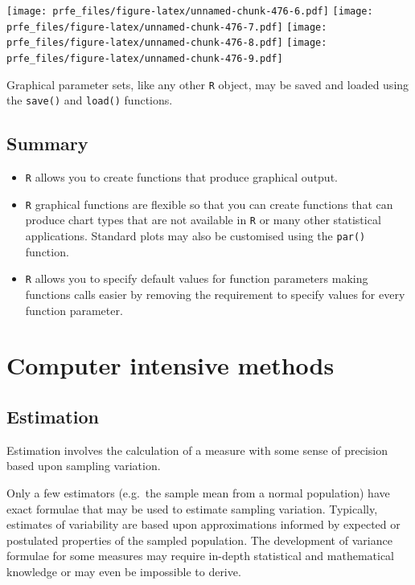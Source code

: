 \documentclass[12pt,a4paper]{book}
\theoremstyle{definition}
\theoremstyle{definition}
\theoremstyle{definition}
\theoremstyle{remark}
\begin{document}
\texttt{[image: prfe\_files/figure-latex/unnamed-chunk-476-6.pdf]}
\texttt{[image: prfe\_files/figure-latex/unnamed-chunk-476-7.pdf]}
\texttt{[image: prfe\_files/figure-latex/unnamed-chunk-476-8.pdf]}
\texttt{[image: prfe\_files/figure-latex/unnamed-chunk-476-9.pdf]}

Graphical parameter sets, like any other \texttt{R} object, may be saved
and loaded using the \texttt{save()} and \texttt{load()} functions.

\hypertarget{summary-7}{%
\section{Summary}\label{summary-7}}

\begin{itemize}
\item
  \texttt{R} allows you to create functions that produce graphical
  output.
\item
  \texttt{R} graphical functions are flexible so that you can create
  functions that can produce chart types that are not available in
  \texttt{R} or many other statistical applications. Standard plots may
  also be customised using the \texttt{par()} function.
\item
  \texttt{R} allows you to specify default values for function
  parameters making functions calls easier by removing the requirement
  to specify values for every function parameter.
\end{itemize}

\hypertarget{exercise9}{%
\chapter{Computer intensive methods}\label{exercise9}}

\hypertarget{estimation}{%
\section{Estimation}\label{estimation}}

Estimation involves the calculation of a measure with some sense of
precision based upon sampling variation.

Only a few estimators (e.g.~the sample mean from a normal population)
have exact formulae that may be used to estimate sampling variation.
Typically, estimates of variability are based upon approximations
informed by expected or postulated properties of the sampled population.
The development of variance formulae for some measures may require
in-depth statistical and mathematical knowledge or may even be
impossible to derive.
\end{document}
